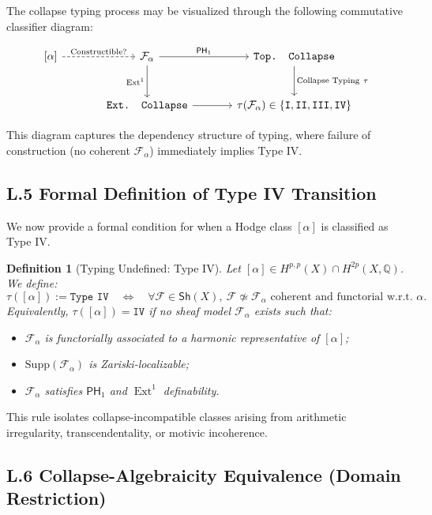 \documentclass[11pt]{article}
\newtheorem{definition}[theorem]{Definition}
\DeclareMathOperator{\Ext}{Ext}
\begin{document}
The collapse typing process may be visualized through the following commutative classifier diagram:

\[
\begin{tikzcd}[row sep=large, column sep=large]
{[\alpha]} \arrow[r, dashed, "\text{Constructible?}"] 
& \mathcal{F}_\alpha \arrow[r, "\mathsf{PH}_1"] \arrow[d, swap, "\Ext^1"]
& \texttt{Top. Collapse} \arrow[d, "\text{Collapse Typing}~\tau"] \\
& \texttt{Ext. Collapse} \arrow[r]
& \tau(\mathcal{F}_\alpha) \in \{\texttt{I}, \texttt{II}, \texttt{III}, \texttt{IV}\}
\end{tikzcd}
\]

This diagram captures the dependency structure of typing, where failure of construction (no coherent $\mathcal{F}_\alpha$) immediately implies Type IV.

\subsection*{L.5 Formal Definition of Type IV Transition}

We now provide a formal condition for when a Hodge class $[\alpha]$ is classified as Type IV.

\begin{definition}[Typing Undefined: Type IV]
Let $[\alpha] \in H^{p,p}(X) \cap H^{2p}(X, \mathbb{Q})$. We define:
\[
\tau([\alpha]) := \texttt{Type IV}
\quad \Longleftrightarrow \quad
\forall \mathcal{F} \in \mathsf{Sh}(X),\ \mathcal{F} \not\simeq \mathcal{F}_\alpha \text{ coherent and functorial w.r.t. } \alpha.
\]
Equivalently, $\tau([\alpha]) = \texttt{IV}$ if no sheaf model $\mathcal{F}_\alpha$ exists such that:
\begin{itemize}
  \item $\mathcal{F}_\alpha$ is functorially associated to a harmonic representative of $[\alpha]$;
  \item $\mathrm{Supp}(\mathcal{F}_\alpha)$ is Zariski-localizable;
  \item $\mathcal{F}_\alpha$ satisfies $\mathsf{PH}_1$ and $\Ext^1$ definability.
\end{itemize}
\end{definition}

This rule isolates collapse-incompatible classes arising from arithmetic irregularity, transcendentality, or motivic incoherence.

\subsection*{L.6 Collapse-Algebraicity Equivalence (Domain Restriction)}
\end{document}
